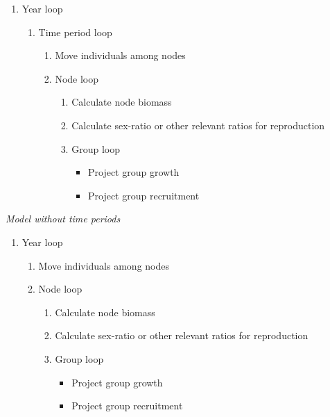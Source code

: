 \documentclass{article}[12pt]
\begin{document}
\begin{enumerate}
\item Year loop
	\begin{enumerate}
	\item Time period loop
		\begin{enumerate}
		\item Move individuals among nodes 
		\item Node loop
			\begin{enumerate}
			\item Calculate node biomass
			\item Calculate sex-ratio or other relevant ratios for reproduction
			\item Group loop
				\begin{itemize}
				\item Project group growth
				\item Project group recruitment
				\end{itemize}
			\end{enumerate}
		\end{enumerate}
	\end{enumerate}
\end{enumerate}



\noindent \textit{Model without time periods}

\begin{enumerate}
\item Year loop
	\begin{enumerate}
	\item Move individuals among nodes 
	\item Node loop
		\begin{enumerate}
		\item Calculate node biomass			\item Calculate sex-ratio or other relevant ratios for reproduction

		\item Group loop
			\begin{itemize}
			\item Project group growth
			\item Project group recruitment
			\end{itemize}
		\end{enumerate}
	\end{enumerate}
\end{enumerate}
\end{document}
